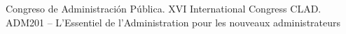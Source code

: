 
\begin{scholarship}
			{Congreso de Administración Pública. XVI International Congress CLAD.}
			{ADM201 – L’Essentiel de l’Administration pour les nouveaux administrateurs}
\end{scholarship}
